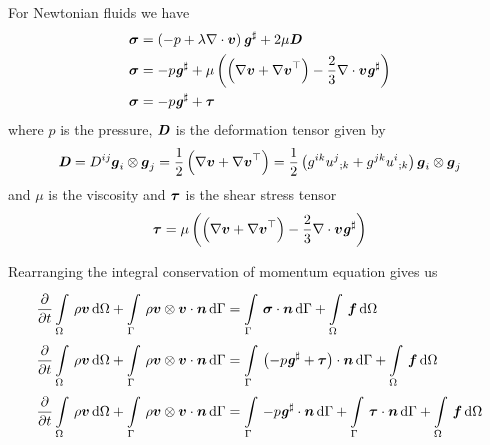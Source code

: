 For Newtonian fluids we have
\begin{equation}
  \begin{split}
    \tensor{\sigma}&=\pbrac{-p+\lambda\divergence{}{\vectr{v}}}\sharptensor{\tensor{g}}+2\mu\tensor{D} \\
    \tensor{\sigma}&=-p\sharptensor{\tensor{g}}+\mu\pbrac{\pbrac{\gradient{}{\vectr{v}}+\transpose{\gradient{}{\vectr{v}}}}-
      \frac{2}{3}\divergence{}{\vectr{v}}\sharptensor{\tensor{g}}}\\
    \tensor{\sigma}&=-p\sharptensor{\tensor{g}}+\tensor{\tau}
  \end{split}
\end{equation}
where $p$ is the pressure, $\boldsymbol{\mathit{D}}$ is the deformation tensor given by
\begin{equation}
  \tensor{D}=D^{ij}\tensorprod{\vectr{g}_{i}}{\vectr{g}_{j}}=\frac{1}{2}\pbrac{\gradient{}{\vectr{v}}+\transpose{\gradient{}{\vectr{v}}}}=\frac{1}{2}\pbrac{g^{ik}\covarderiv{u^{j}}{k}+g^{jk}\covarderiv{u^{i}}{k}}\tensorprod{\vectr{g}_{i}}{\vectr{g}_{j}}
\end{equation}
and $\mu$ is the viscosity and $\boldsymbol{\mathit{\tau}}$ is the shear stress tensor \ie
\begin{equation}
  \tensor{\tau}=\mu\pbrac{\pbrac{\gradient{}{\vectr{v}}+\transpose{\gradient{}{\vectr{v}}}}-
    \frac{2}{3}\divergence{}{\vectr{v}}\sharptensor{\tensor{g}}}
\end{equation}

Rearranging the integral conservation of momentum equation gives us
\begin{equation}
  \begin{split}
    \delby{}{t}\gint{\Omega}{}{\rho\vectr{v}}{\Omega}
    +\gint{\Gamma}{}{\dotprod{\tensorprod{\rho\vectr{v}}{\vectr{v}}}{\vectr{n}}}{\Gamma}
    &=\gint{\Gamma}{}{\dotprod{\tensor{\sigma}}{\vectr{n}}}{\Gamma}+\gint{\Omega}{}{\vectr{f}}{\Omega}\\
    \delby{}{t}\gint{\Omega}{}{\rho\vectr{v}}{\Omega}
    +\gint{\Gamma}{}{\dotprod{\tensorprod{\rho\vectr{v}}{\vectr{v}}}{\vectr{n}}}{\Gamma}
    &=\gint{\Gamma}{}{\dotprod{\pbrac{-p\sharptensor{\tensor{g}}+\tensor{\tau}}}{\vectr{n}}}{\Gamma}
    +\gint{\Omega}{}{\vectr{f}}{\Omega}
    \\ \delby{}{t}\gint{\Omega}{}{\rho\vectr{v}}{\Omega}
    +\gint{\Gamma}{}{\dotprod{\tensorprod{\rho\vectr{v}}{\vectr{v}}}{\vectr{n}}}{\Gamma}
    &=\gint{\Gamma}{}{\dotprod{-p\sharptensor{\tensor{g}}}{\vectr{n}}}{\Gamma}
    +\gint{\Gamma}{}{\dotprod{\tensor{\tau}}{\vectr{n}}}{\Gamma}+\gint{\Omega}{}{\vectr{f}}{\Omega}\\
  \end{split}
  \label{eqn:integralconservationofmomentum}
\end{equation}

